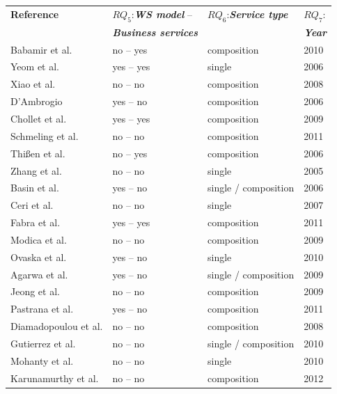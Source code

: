 \documentclass[english,12pt]{article}
\begin{document}
 
\begin{table}[ht!]
\centering
\small
\begin{tabular}{l|l|l|l}
  \hline 
  \hline
   \textbf{Reference} & $RQ_5$:\textbf{\textit{WS model}} --
   & $RQ_6$:\textbf{\textit{Service type}}  &
   $RQ_7$: 
   \\
    &   \textbf{\textit{Business services}} &   & \textbf{\textit{Year}}
   \\
  \hline
  \hline  
  Babamir et al. \cite{Babamir2010} & no -- yes  & composition & 2010   
 \\  
  \hline   
  Yeom et al. \cite{Yeom2006} & yes -- yes & single   & 2006  \\  \hline
  Xiao et al. \cite{XiaoCZBOLH08} & no -- no & composition    & 2008
   \\ 
  \hline 
  D'Ambrogio \cite{DAmbrogio06} & yes  -- no & composition  & 2006 \\
   \hline
  Chollet et al. \cite{CholletL09} & yes -- yes & composition  &  2009 \\
  \hline 
  Schmeling et al. \cite{SchmelingCM11} & no -- no & composition &  2011 \\ 
  \hline
   Thi{\ss}en et al. \cite{ThissenW06} & no -- yes & composition & 2006
   \\
  \hline
  Zhang et al. \cite{ZhangPSP05} & no -- no  & single  & 2005 \\ 
  \hline
  Basin et al. \cite{BasinDL06} & yes -- no & single / composition  & 
  2006\\
  \hline 
  Ceri et al. \cite{CeriDMF07} & no -- no  & single  &  2007\\ 
  \hline 
  Fabra et al. \cite{Fabra2011} & yes -- yes & composition  &  2011\\
  \hline
  Modica et al. \cite{ModicaTV09} & no -- no & composition & 2009\\ 
  \hline
  Ovaska et al. \cite{OvaskaEHPA10} & yes -- no & single & 2010\\
  \hline
  Agarwa et al. \cite{AgarwalLS09} & yes -- no & single / composition  &  
  2009\\
  \hline
  Jeong et al. \cite{JeongCL09} & no -- no  & composition &  2009\\
  \hline
  Pastrana et al. \cite{PastranaPK11} & yes -- no & composition &  2011 \\
  \hline
  Diamadopoulou et al. \cite{DiamadopoulouMPS08} & no -- no & composition 
  & 2008\\
  \hline
  Gutierrez et al. \cite{GutierrezRF10} & no -- no &  single / composition 
  & 2010\\
  \hline
  Mohanty et al. \cite{MohantyRP10} & no -- no  & single  & 2010\\
  \hline
   Karunamurthy et al. \cite{Karunamurthy2012787}& no -- no  & composition  &
   2012\\
  

\end{tabular}
\end{table}
\end{document}
